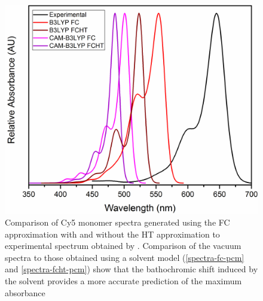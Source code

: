 \begin{figure}[h!]
  \centering
  \includegraphics[width=0.8\linewidth]{figures/pub1/FCHT-vac.pdf}
  \caption[Comparison of Cy5 monomer spectra generated using the FC approximation with and without the HT approximation to experimental spectrum obtained by Cannon. Comparison of the vacuum spectra to those obtained using a solvent model (\autoref{spectra-fc-pcm} and \autoref{spectra-fcht-pcm}) show that the bathochromic shift induced by the solvent provides a more accurate prediction of the maximum absorbance]{Comparison of Cy5 monomer spectra generated using the FC approximation with and without the HT approximation to experimental spectrum obtained by \citet{Cannon2017}. Comparison of the vacuum spectra to those obtained using a solvent model (\autoref{spectra-fc-pcm} and \autoref{spectra-fcht-pcm}) show that the bathochromic shift induced by the solvent provides a more accurate prediction of the maximum absorbance}\label{spectra-vac}
\end{figure}